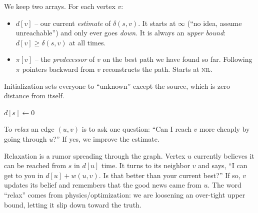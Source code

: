 We keep two arrays. For each vertex $v$:
\begin{itemize}
\item $d[v]$ -- our current \emph{estimate} of $\delta(s, v)$. It starts at
$\infty$ (``no idea, assume unreachable'') and only ever goes \emph{down}. It is
always an \emph{upper bound}: $d[v] \ge \delta(s,v)$ at all times.
\item $\pi[v]$ -- the \emph{predecessor} of $v$ on the best path we have found so
far. Following $\pi$ pointers backward from $v$ reconstructs the path. Starts at
\textsc{nil}.
\end{itemize}

Initialization sets everyone to ``unknown'' except the source, which is zero
distance from itself.

\begin{algorithm}[H]
\caption{\textsc{Initialize-Single-Source}($G, s$)}
$d[s] \leftarrow 0$\;
\end{algorithm}

To \emph{relax} an edge $(u,v)$ is to ask one question:
``Can I reach $v$ more cheaply by going through $u$?'' If yes, we improve the
estimate.

\begin{algorithm}[H]
\caption{\textsc{Relax}($u, v, w$)}
\end{algorithm}

\begin{intuitionbox}
Relaxation is a rumor spreading through the graph. Vertex $u$ currently believes
it can be reached from $s$ in $d[u]$ time. It turns to its neighbor $v$ and says,
``I can get to you in $d[u] + w(u,v)$. Is that better than your current best?'' If
so, $v$ updates its belief and remembers that the good news came from $u$. The
word ``relax'' comes from physics/optimization: we are loosening an
over-tight upper bound, letting it slip down toward the truth.
\end{intuitionbox}

